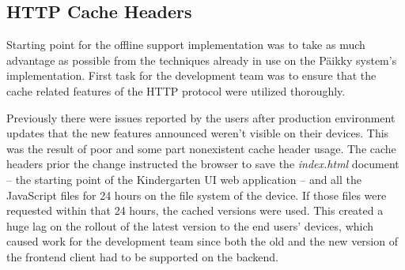 \subsection{HTTP Cache Headers}


Starting point for the offline support implementation was to take as much advantage as possible from the techniques already in use on the Päikky system's implementation. First task for the development team was to ensure that the cache related features of the HTTP protocol were utilized thoroughly.

Previously there were issues reported by the users after production environment updates that the new features announced weren't visible on their devices. This was the result of poor and some part nonexistent cache header usage. The cache headers prior the change instructed the browser to save the \textit{index.html} document – the starting point of the Kindergarten UI web application – and all the JavaScript files for 24 hours on the file system of the device. If those files were requested within that 24 hours, the cached versions were used. This created a huge lag on the rollout of the latest version to the end users' devices, which caused work for the development team since both the old and the new version of the frontend client had to be supported on the backend.

